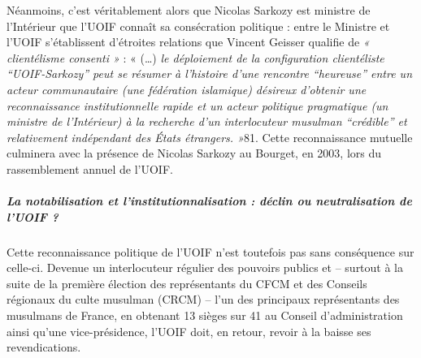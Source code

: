 Néanmoins, c'est véritablement alors que Nicolas Sarkozy est ministre de
l'Intérieur que l'UOIF connaît sa consécration politique : entre le
Ministre et l'UOIF s'établissent d'étroites relations que Vincent
Geisser qualifie de \emph{« clientélisme consenti »} : « (\ldots)
\emph{le déploiement de la configuration clientéliste ``UOIF-Sarkozy''
peut se résumer à l'histoire d'une rencontre ``heureuse'' entre un
acteur communautaire (une fédération islamique) désireux d'obtenir une
reconnaissance institutionnelle rapide et un acteur politique
pragmatique (un ministre de l'Intérieur) à la recherche d'un
interlocuteur musulman ``crédible'' et relativement indépendant des
États étrangers. »}81. Cette reconnaissance mutuelle culminera avec la
présence de Nicolas Sarkozy au Bourget, en 2003, lors du rassemblement
annuel de l'UOIF.

\subparagraph{La notabilisation et l'institutionnalisation : déclin ou
neutralisation de l'UOIF
?}

Cette reconnaissance politique de l'UOIF n'est toutefois pas sans
conséquence sur celle-ci. Devenue un interlocuteur régulier des pouvoirs
publics et -- surtout à la suite de la première élection des
représentants du CFCM et des Conseils régionaux du culte musulman (CRCM)
-- l'un des principaux représentants des musulmans de France, en
obtenant 13 sièges sur 41 au Conseil d'administration ainsi qu'une
vice-présidence, l'UOIF doit, en retour, revoir à la baisse ses
revendications.

